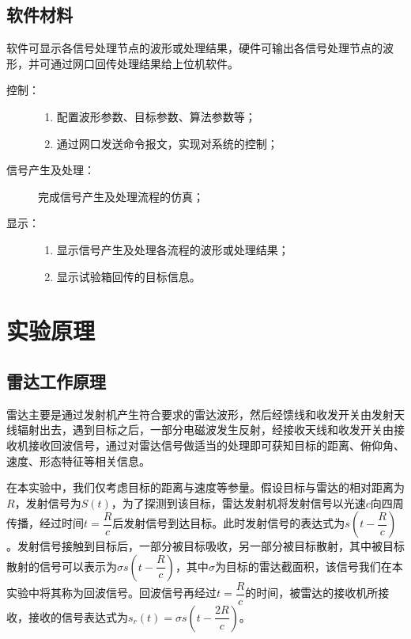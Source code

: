 \documentclass{article}
\newcounter{sub}
\begin{document}
\subsection{软件材料}%
\label{sub:软件材料}

软件可显示各信号处理节点的波形或处理结果，硬件可输出各信号处理节点的波形，并可通过网口回传处理结果给上位机软件。

\begin{description}
	\item[控制：]
		\begin{enumerate}
			\item 配置波形参数、目标参数、算法参数等；
			\item 通过网口发送命令报文，实现对系统的控制；
		\end{enumerate}
	\item[信号产生及处理：] 完成信号产生及处理流程的仿真；
	\item[显示：]
		\begin{enumerate}
			\item 显示信号产生及处理各流程的波形或处理结果；
			\item 显示试验箱回传的目标信息。
		\end{enumerate}
\end{description}

\section{实验原理}%
\label{sec:实验原理}

\subsection{雷达工作原理}%
\label{sub:雷达工作原理}

雷达主要是通过发射机产生符合要求的雷达波形，然后经馈线和收发开关由发射天线辐射出去，遇到目标之后，一部分电磁波发生反射，经接收天线和收发开关由接收机接收回波信号，通过对雷达信号做适当的处理即可获知目标的距离、俯仰角、速度、形态特征等相关信息。\cite{radar}

在本实验中，我们仅考虑目标的距离与速度等参量。假设目标与雷达的相对距离为$ R $，发射信号为$ S(t) $，为了探测到该目标，雷达发射机将发射信号以光速$ c $向四周传播，经过时间$ t=\dfrac{R}{c} $后发射信号到达目标。此时发射信号的表达式为$ s(t-\dfrac{R}{c}) $。发射信号接触到目标后，一部分被目标吸收，另一部分被目标散射，其中被目标散射的信号可以表示为$ \sigma s(t-\dfrac{R}{c}) $，其中$ \sigma $为目标的雷达截面积，该信号我们在本实验中将其称为回波信号。回波信号再经过$ t=\dfrac{R}{c} $的时间，被雷达的接收机所接收，接收的信号表达式为$ s_r(t)=\sigma s(t-\dfrac{2R}{c}) $。
\end{document}
